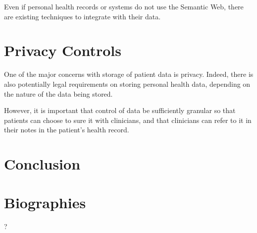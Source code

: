 \documentclass{chi-ext}
\begin{document}
Even if personal health records or systems do not use the Semantic Web, there are existing
techniques to integrate with their data.


\section{Privacy Controls}

One of the major concerns with storage of patient data is privacy. Indeed, there is also potentially
legal requirements on storing personal health data, depending on the nature of the data being
stored.

However, it is important that control of data be sufficiently granular so that patients can choose
to sure it with clinicians, and that clinicians can refer to it in their notes in the patient's health
record.


\section{Conclusion}



\section{Biographies}
?
\end{document}
